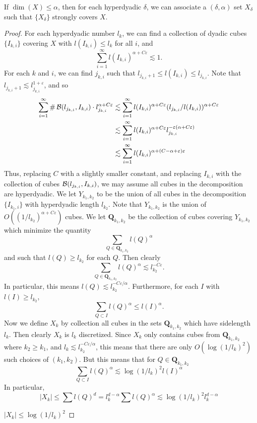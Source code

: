 \begin{theorem}
	If $\dim(X) \leq \alpha$, then for each hyperdyadic $\delta$, we can associate a $(\delta,\alpha)$ set $X_\delta$ such that $\{ X_\delta \}$ strongly covers $X$.
\end{theorem}
\begin{proof}
	For each hyperdyadic number $l_k$, we can find a collection of dyadic cubes $\{ I_{k,i} \}$ covering $X$ with $l(I_{k,i}) \leq l_k$ for all $i$, and
	\[ \sum_{i = 1}^\infty l(I_{k,i})^{\alpha + C\varepsilon} \lesssim 1. \]
	For each $k$ and $i$, we can find $j_{k,i}$ such that $l_{j_{k,i} + 1} \leq l(I_{k,i}) \leq l_{j_{k,i}}$. Note that $l_{j_{k,i} + 1} \lesssim l_{j_{k,i}}^{1 + \varepsilon}$, and so
	\begin{align*}
		\sum_{i = 1}^\infty \# \operatorname{\mathcal{B}}(l_{j_{k,i}}, I_{k,i}) \cdot l_{j_{k,i}}^{\alpha + C\varepsilon} &\lesssim \sum_{i = 1}^\infty l(I_{k,i})^{\alpha + C \varepsilon} (l_{j_{k,i}} / l(I_{k,i}))^{\alpha + C\varepsilon}\\
		&\lesssim \sum_{i = 1}^\infty l(I_{k,i})^{\alpha + C\varepsilon} l_{j_{k,i}}^{-\varepsilon(\alpha + C\varepsilon)}\\
		&\lesssim \sum_{i = 1}^\infty l(I_{k,i})^{\alpha + (C - \alpha + \varepsilon) \varepsilon}
	\end{align*}
	Thus, replacing $C$ with a slightly smaller constant, and replacing $I_{k,i}$ with the collection of cubes $\operatorname{\mathcal{B}}(l_{j_{k,i}}, I_{k,i})$, we may assume all cubes in the decomposition are hyperdyadic. We let $Y_{k_1,k_2}$ to be the union of all cubes in the decomposition $\{ I_{k_1,i} \}$ with hyperdyadic length $l_{k_2}$. Note that $Y_{k_1,k_2}$ is the union of $O((1/l_{k_2})^{\alpha + C\varepsilon})$ cubes. We let $\mathbf{Q}_{k_1,k_2}$ be the collection of cubes covering $Y_{k_1,k_2}$ which minimize the quantity
	\[ \sum_{Q \in \mathbf{Q}_{k_1,k_2}} l(Q)^\alpha \]
	and such that $l(Q) \geq l_{k_2}$ for each $Q$. Then clearly
	\[ \sum_{Q \in \mathbf{Q}_{k_1,k_2}} l(Q)^\alpha \lesssim l_{k_2}^{- C\varepsilon}. \]
	In particular, this means $l(Q) \lesssim l_{k_2}^{-C\varepsilon/\alpha}$. Furthermore, for each $I$ with $l(I) \geq l_{k_2}$,
	\[ \sum_{Q \subset I} l(Q)^\alpha \leq l(I)^\alpha. \]
	Now we define $X_k$ by collection all cubes in the sets $\mathbf{Q}_{k_1,k_2}$ which have sidelength $l_k$. Then clearly $X_k$ is $l_k$ discretized. Since $X_k$ only contains cubes from $\mathbf{Q}_{k_1,k_2}$ where $k_2 \geq k_1$, and $l_k \lesssim l_{k_2}^{-C\varepsilon/\alpha}$, this means that there are only $O(\log(1/l_k)^2)$ such choices of $(k_1,k_2)$. But this means that for $Q \in \mathbf{Q}_{k_1,k_2}$
	\[ \sum_{Q \subset I} l(Q)^\alpha \lesssim \log(1/l_k)^2 l(I)^\alpha \]
	In particular,
	\[ |X_k| \leq \sum l(Q)^d = l_k^{d - \alpha} \sum l(Q)^\alpha \lesssim \log(1/l_k)^2 l_k^{d-\alpha} \]


	$|X_k| \leq \log(1/l_k)^2$
\end{proof}










